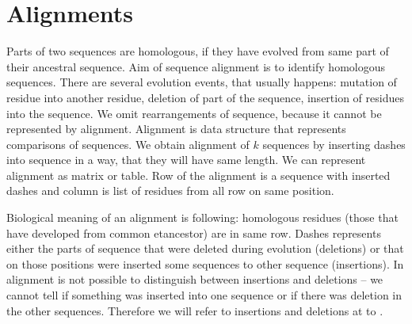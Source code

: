\chapter{Alignments}

Parts of two sequences are homologous, if they have evolved from same part of
their ancestral sequence. Aim of sequence alignment is to identify homologous
sequences. There are several evolution events, that usually happens:
mutation of residue into another residue, deletion of part of the sequence,
insertion of residues into the sequence. We omit rearrangements of sequence,
because it cannot be represented by alignment. Alignment is data structure that
represents comparisons of sequences. We obtain alignment of $k$ sequences by
inserting dashes into sequence in a way, that they will have same length. We can
represent alignment as matrix or table. Row of the alignment is a sequence with
inserted dashes and column is list of residues from all row on same position.


Biological meaning of an alignment is following: homologous residues (those that
have developed from common etancestor) are in same row. Dashes represents either
the parts of sequence that were deleted during evolution (deletions) or that on
those positions were inserted some sequences to other sequence (insertions). In
alignment is not possible to distinguish between insertions and deletions -- we
cannot tell if something was inserted into one sequence or if there was deletion 
in the other sequences. Therefore we will refer to insertions and deletions at
to .

